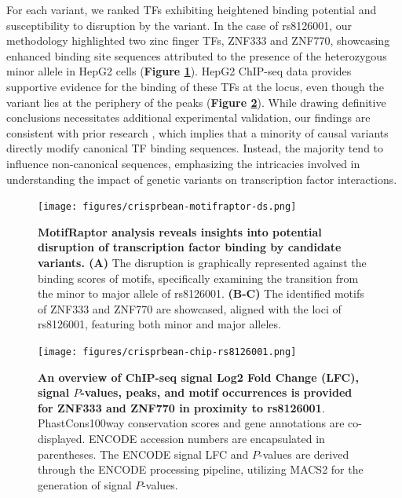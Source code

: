 \documentclass[a4paper, titlepage, openright]{book}
\newcommand{\motifraptor}{MotifRaptor\xspace}
\begin{document}
For each variant, we ranked TFs exhibiting heightened binding potential and susceptibility to disruption by the variant. In the case of rs8126001, our methodology highlighted two zinc finger TFs, ZNF333 and ZNF770, showcasing enhanced binding site sequences attributed to the presence of the heterozygous minor allele in HepG2 cells (\textbf{Figure \ref{fig:crisprbean-motifraptor-ds}}). HepG2 ChIP-seq data provides supportive evidence for the binding of these TFs at the locus, even though the variant lies at the periphery of the peaks (\textbf{Figure \ref{fig:crisprbean-chip-variant}}). While drawing definitive conclusions necessitates additional experimental validation, our findings are consistent with prior research \citep{farh2015genetic}, which implies that a minority of causal variants directly modify canonical TF binding sequences. Instead, the majority tend to influence non-canonical sequences, emphasizing the intricacies involved in understanding the impact of genetic variants on transcription factor interactions.

\begin{figure}[!]
	\centering
	\texttt{[image: figures/crisprbean-motifraptor-ds.png]}
	\caption[\motifraptor analysis reveals insights into potential disruption of transcription factor binding by candidate variants]{\textbf{\motifraptor analysis reveals insights into potential disruption of transcription factor binding by candidate variants. (A)} The disruption is graphically represented against the binding scores of motifs, specifically examining the transition from the minor to major allele of rs8126001. \textbf{(B-C)} The identified motifs of ZNF333 and ZNF770 are showcased, aligned with the loci of rs8126001, featuring both minor and major alleles.}
	\label{fig:crisprbean-motifraptor-ds}
\end{figure}

\begin{figure}[!]
	\centering
	\texttt{[image: figures/crisprbean-chip-rs8126001.png]}
	\caption[An overview of ChIP-seq signal Log2 Fold Change (LFC), signal $P$-values, peaks, and motif occurrences is provided for ZNF333 and ZNF770 in proximity to rs8126001]{\textbf{An overview of ChIP-seq signal Log2 Fold Change (LFC), signal $P$-values, peaks, and motif occurrences is provided for ZNF333 and ZNF770 in proximity to rs8126001}. PhastCons100way conservation scores and gene annotations are co-displayed. ENCODE accession numbers are encapsulated in parentheses. The ENCODE signal LFC and $P$-values are derived through the ENCODE processing pipeline, utilizing MACS2 \citep{zhang2008model} for the generation of signal $P$-values.}
	\label{fig:crisprbean-chip-variant}
\end{figure} 
\end{document}
